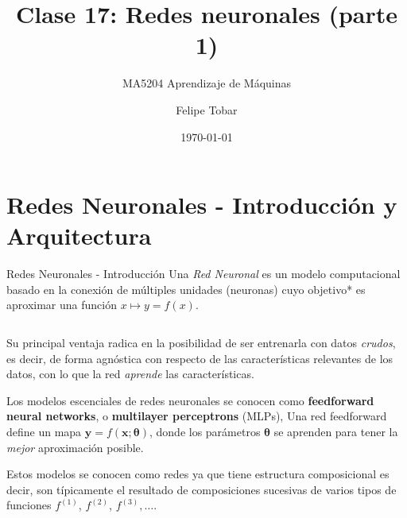 \documentclass[handout, 9pt]{beamer}
\title{Clase 17: Redes neuronales (parte 1)}
\subtitle{MA5204 Aprendizaje de Máquinas}
\date{\today}
\author{Felipe Tobar}
\institute{Iniciativa de Datos e Inteligencia Artificial\\Universidad de Chile}
\begin{document}
\begin{frame}
  \titlepage
\end{frame}

\section{Redes Neuronales - Introducción y Arquitectura}
\begin{frame}{Redes Neuronales - Introducción}
Una \textit{Red Neuronal} es un modelo computacional basado en la conexión de múltiples unidades (neuronas) cuyo objetivo* es aproximar una función $x\mapsto y=f(x)$.
\pause

\begin{columns}

  \begin{column}{0.5\textwidth}

  Su principal ventaja radica en la posibilidad de ser entrenarla con datos \emph{crudos}, es decir, de forma agnóstica con respecto de las características relevantes de los datos, con lo que la red \emph{aprende} las características. \pause

  \vspace{0.1cm}
  Los modelos escenciales de redes neuronales se conocen como \textbf{feedforward neural networks}, o \textbf{multilayer perceptrons} (MLPs), Una red feedforward define un mapa $\bm{y}=f(\bm{x}; \bm{\theta})$, donde los parámetros $\bm{\theta}$ se aprenden para tener la \emph{mejor} aproximación posible. \pause

  \vspace{0.1cm}

  Estos modelos se conocen como redes ya que tiene estructura composicional es decir, son típicamente el resultado de composiciones sucesivas de varios tipos de funciones $f^{(1)}$, $f^{(2)}$, $f^{(3)}, \dots$. \pause


\end{column}
\end{columns}
\end{frame}
\end{document}
